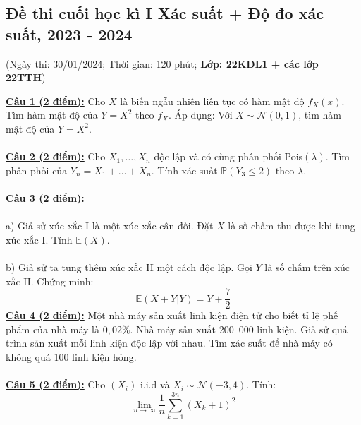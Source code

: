 \documentclass[10pt, a4paper]{article}
\begin{document}
\newpage

\subsection{Đề thi cuối học kì I Xác suất + Độ đo xác suất, 2023 - 2024}
\begin{center}
	\color{blue}(Ngày thi: 30/01/2024; Thời gian: 120 phút; \textbf{Lớp: 22KDL1 + các lớp 22TTH})
\end{center}
\color{red}\underline{\textbf{Câu 1 (2 điểm):}} \color{black}Cho $X$ là biến ngẫu nhiên liên tục có hàm mật độ $f_X(x)$. Tìm hàm mật độ của $Y=X^2$ theo $f_X$. Áp dụng: Với $X\sim\mathcal N(0,1)$, tìm hàm mật độ của $Y=X^2$.\\\\
\color{red}\underline{\textbf{Câu 2 (2 điểm):}} \color{black}Cho $X_1,\dots,X_n$ độc lập và có cùng phân phối Pois$(\lambda)$. Tìm phân phối của $Y_n=X_1+\ldots+X_n$. Tính xác suất $\mathbb P(Y_3\le2)$ theo $\lambda$.\\\\
\color{red}\underline{\textbf{Câu 3 (2 điểm):}}\\\\
a) \color{black}Giả sử xúc xắc I là một xúc xắc cân đối. Đặt $X$ là số chấm thu được khi tung xúc xắc I. Tính $\mathbb E(X)$.\\\\
\color{red}b) \color{black}Giả sử ta tung thêm xúc xắc II một cách độc lập. Gọi $Y$ là số chấm trên xúc xắc II. Chứng minh: $$\mathbb E(X+Y|Y)=Y+\dfrac72$$
\color{red}\underline{\textbf{Câu 4 (2 điểm):}} \color{black}Một nhà máy sản xuất linh kiện điện tử cho biết tỉ lệ phế phẩm của nhà máy là $0,02\%$. Nhà máy sản xuất 200~000 linh kiện. Giả sử quá trình sản xuất mỗi linh kiện độc lập với nhau. Tìm xác suất để nhà máy có không quá 100 linh kiện hỏng.\\\\
\color{red}\underline{\textbf{Câu 5 (2 điểm):}} \color{black}Cho $(X_i)$ i.i.d và $X_i\sim\mathcal N(-3,4)$. Tính: $$\displaystyle\lim_{n\rightarrow\infty}\dfrac1n\displaystyle\sum_{k=1}^{3n}(X_k+1)^2$$
\end{document}
